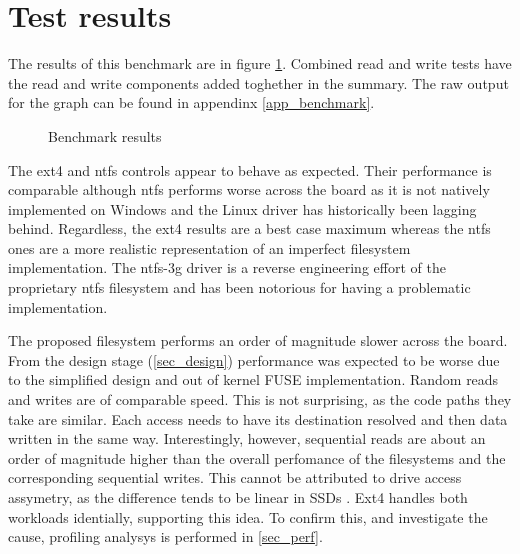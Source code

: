     \section{Test results}

        The results of this benchmark are in figure \ref{fig_benchmark}.
        Combined read and write tests have the read and write components added
        toghether in the summary. The raw output for the graph can be found in
        appendinx \ref{app_benchmark}.

        \begin{figure}[h!]
            \caption{Benchmark results}
            
            \label{fig_benchmark}
        \end{figure}

        The ext4 and ntfs controls appear to behave as expected. Their
        performance is comparable although ntfs performs worse across the board
        as it is not natively implemented on Windows and the Linux driver has
        historically been lagging behind. Regardless, the ext4 results are a
        best case maximum whereas the ntfs ones are a more realistic
        representation of an imperfect filesystem implementation. The ntfs-3g
        driver is a reverse engineering effort of the proprietary ntfs
        filesystem and has been notorious for having a problematic
        implementation.

        The proposed filesystem performs an order of magnitude slower across
        the board. From the design stage (\ref{sec_design}) performance was
        expected to be worse due to the simplified design and out of kernel
        FUSE implementation. Random reads and writes are of comparable speed.
        This is not surprising, as the code paths they take are similar. Each
        access needs to have its destination resolved and then data written in
        the same way. Interestingly, however, sequential reads are about an
        order of magnitude higher than the overall perfomance of the
        filesystems and the corresponding sequential writes. This cannot be
        attributed to drive access assymetry, as the difference tends to be
        linear in SSDs \cite{servethehome_review}. Ext4 handles both workloads
        identially, supporting this idea. To confirm this, and investigate the
        cause, profiling analysys is performed in \ref{sec_perf}.

